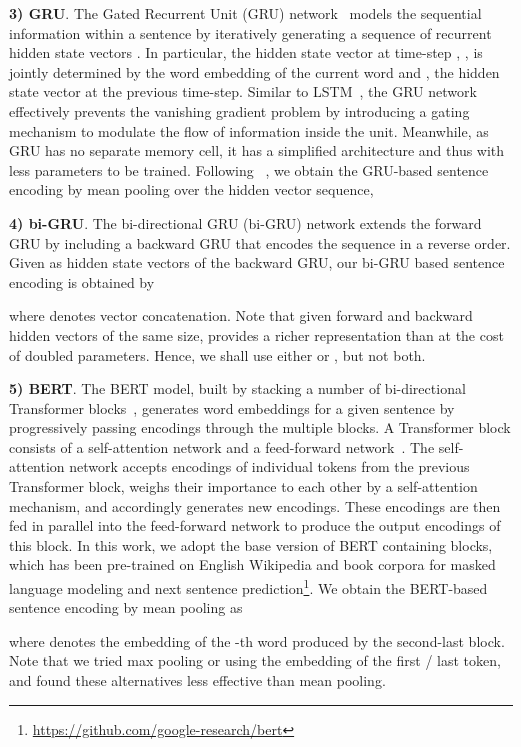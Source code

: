 \textbf{3) GRU}. The Gated Recurrent Unit (GRU) network~\cite{gru} models the sequential information within a sentence by iteratively generating a sequence of recurrent hidden state vectors . In particular, the hidden state vector at time-step , , is jointly determined by the word embedding of the current word  and  , the hidden state vector at the previous time-step. Similar to LSTM~\cite{lstm}, the GRU network effectively prevents the vanishing gradient problem by introducing a gating mechanism to modulate the flow of information inside the unit. Meanwhile, as GRU has no separate memory cell, it has a simplified architecture and thus with less parameters to be trained. Following ~\cite{w2vvpp}, we obtain the GRU-based sentence encoding by mean pooling over the hidden vector sequence, \ie


\textbf{4) bi-GRU}. The bi-directional GRU (bi-GRU) network extends the forward GRU by including a backward GRU that encodes the sequence in a reverse order. Given  as hidden state vectors of the backward GRU, our bi-GRU based sentence encoding is obtained by 

where  denotes vector concatenation. Note that given forward and backward hidden vectors of the same size,  provides a richer representation than  at the cost of doubled parameters. Hence, we shall use either  or , but not both. 


\textbf{5) BERT}. The BERT model, built by stacking a number of  bi-directional Transformer blocks~\cite{bert}, generates word embeddings for a given sentence by progressively passing encodings through the multiple blocks. A Transformer block consists of a self-attention network and a feed-forward network~\cite{transformer}. The self-attention network accepts encodings of individual tokens from the previous Transformer block, weighs their importance to each other by a self-attention mechanism, and accordingly generates new encodings. These encodings are then fed in parallel into the feed-forward network to produce the output encodings of this block. In this work, we adopt the base version of BERT containing  blocks, which has been pre-trained on English Wikipedia and book corpora for masked language modeling and next sentence prediction\footnote{\url{https://github.com/google-research/bert}\label{bert}}. We obtain the BERT-based sentence encoding by mean pooling as 

where  denotes the embedding of the -th word produced by the second-last block. Note that we tried max pooling or using the embedding of the first / last token, and found these alternatives less effective than mean pooling.




